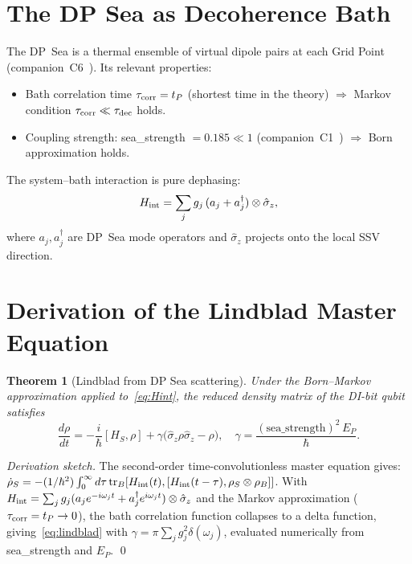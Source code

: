 \documentclass[11pt,a4paper]{article}
\newtheorem{theorem}{Theorem}[section]
\newcommand{\tP}{t_P}
\newcommand{\EP}{E_P}
\begin{document}
\section{The DP Sea as Decoherence Bath}

The DP~Sea is a thermal ensemble of virtual dipole pairs at each Grid
Point (companion~C6~\cite{abshier2026c6}).  Its relevant properties:
\begin{itemize}
\item Bath correlation time $\tau_{\rm corr} = \tP$ (shortest time in
  the theory) $\Rightarrow$ Markov condition $\tau_{\rm corr} \ll
  \tau_{\rm dec}$ holds.
\item Coupling strength: sea\_strength $= 0.185 \ll 1$
  (companion~C1~\cite{abshier2026c1}) $\Rightarrow$ Born approximation holds.
\end{itemize}

The system--bath interaction is pure dephasing:
\begin{equation}
H_{\rm int} = \sum_j g_j\,(a_j + a_j^\dagger) \otimes \hat{\sigma}_z,
\label{eq:Hint}
\end{equation}
where $a_j, a_j^\dagger$ are DP~Sea mode operators and $\hat{\sigma}_z$
projects onto the local SSV direction.

\section{Derivation of the Lindblad Master Equation}

\begin{theorem}[Lindblad from DP Sea scattering]
\label{thm:lindblad}
Under the Born--Markov approximation applied to~\eqref{eq:Hint},
the reduced density matrix of the DI-bit qubit satisfies
\begin{equation}
\frac{d\rho}{dt} = -\frac{i}{\hbar}[H_S,\rho]
+ \gamma\bigl(\hat{\sigma}_z\rho\hat{\sigma}_z - \rho\bigr),
\quad
\gamma = \frac{(\text{sea\_strength})^2\,\EP}{\hbar}.
\label{eq:lindblad}
\end{equation}
\end{theorem}

\begin{proof}[Derivation sketch]
The second-order time-convolutionless master equation gives:
$\dot{\rho}_S = -(1/\hbar^2)\int_0^\infty d\tau\,
\mathrm{tr}_B[H_{\rm int}(t),[H_{\rm int}(t-\tau),\rho_S\otimes\rho_B]]$.
With $H_{\rm int} = \sum_j g_j(a_je^{-i\omega_j t}
+ a_j^\dagger e^{i\omega_j t})\otimes\hat{\sigma}_z$ and the Markov
approximation ($\tau_{\rm corr} = \tP \to 0$),
the bath correlation function collapses to a delta function,
giving~\eqref{eq:lindblad} with
$\gamma = \pi\sum_j g_j^2\delta(\omega_j)$, evaluated numerically
from sea\_strength and $\EP$. \qed
\end{proof}
\end{document}
